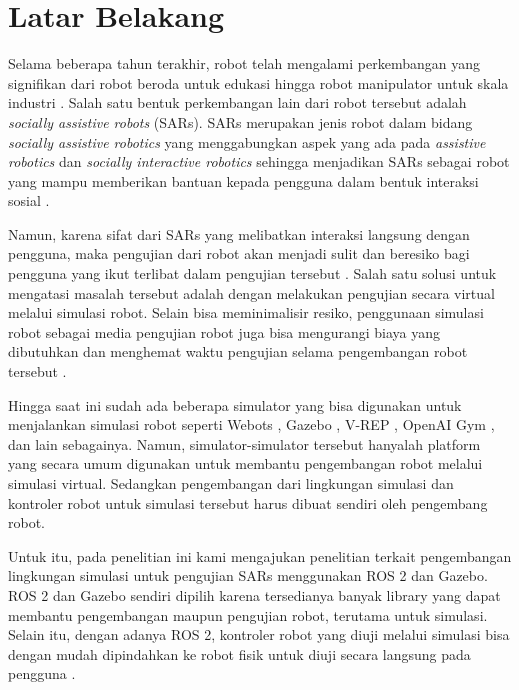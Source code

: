 \section{Latar Belakang}
\label{sec:latarbelakang}

Selama beberapa tahun terakhir, robot telah mengalami perkembangan yang signifikan dari robot beroda untuk edukasi \citep{goncalves2009} hingga robot manipulator untuk skala industri \citep{Blatnicky2020}.
Salah satu bentuk perkembangan lain dari robot tersebut adalah \emph{socially assistive robots} (SARs).
SARs merupakan jenis robot dalam bidang \emph{socially assistive robotics} yang menggabungkan aspek yang ada pada \emph{assistive robotics} dan \emph{socially interactive robotics} sehingga menjadikan SARs sebagai robot yang mampu memberikan bantuan kepada pengguna dalam bentuk interaksi sosial \citep{seifer2005}.

Namun, karena sifat dari SARs yang melibatkan interaksi langsung dengan pengguna, maka pengujian dari robot akan menjadi sulit dan beresiko bagi pengguna yang ikut terlibat dalam pengujian tersebut \citep{erickson2020}.
Salah satu solusi untuk mengatasi masalah tersebut adalah dengan melakukan pengujian secara virtual melalui simulasi robot.
Selain bisa meminimalisir resiko, penggunaan simulasi robot sebagai media pengujian robot juga bisa mengurangi biaya yang dibutuhkan dan menghemat waktu pengujian selama pengembangan robot tersebut \citep{takaya2016}.

Hingga saat ini sudah ada beberapa simulator yang bisa digunakan untuk menjalankan simulasi robot seperti Webots \citep{michel2004}, Gazebo \citep{koenig2004}, V-REP \citep{rohmer2013}, OpenAI Gym \citep{brockman2016}, dan lain sebagainya.
Namun, simulator-simulator tersebut hanyalah platform yang secara umum digunakan untuk membantu pengembangan robot melalui simulasi virtual.
Sedangkan pengembangan dari lingkungan simulasi dan kontroler robot untuk simulasi tersebut harus dibuat sendiri oleh pengembang robot.

Untuk itu, pada penelitian ini kami mengajukan penelitian terkait pengembangan lingkungan simulasi untuk pengujian SARs menggunakan ROS 2 dan Gazebo.
ROS 2 dan Gazebo sendiri dipilih karena tersedianya banyak library yang dapat membantu pengembangan maupun pengujian robot, terutama untuk simulasi.
Selain itu, dengan adanya ROS 2, kontroler robot yang diuji melalui simulasi bisa dengan mudah dipindahkan ke robot fisik untuk diuji secara langsung pada pengguna \citep{takaya2016}.
